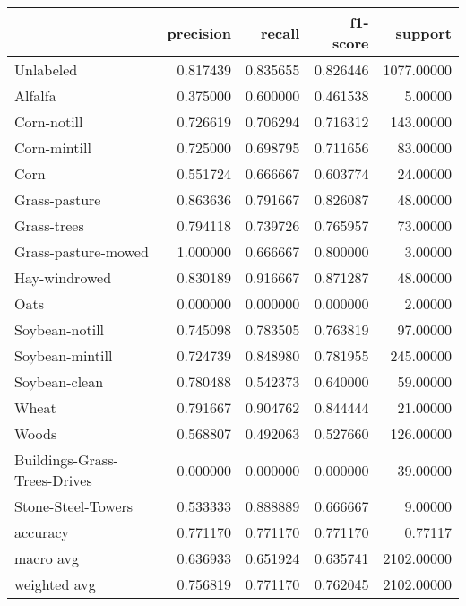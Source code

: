 \begin{tabular}{lrrrr}
\toprule
{} &  precision &    recall &  f1-score &     support \\
\midrule
Unlabeled                    &   0.817439 &  0.835655 &  0.826446 &  1077.00000 \\
Alfalfa                      &   0.375000 &  0.600000 &  0.461538 &     5.00000 \\
Corn-notill                  &   0.726619 &  0.706294 &  0.716312 &   143.00000 \\
Corn-mintill                 &   0.725000 &  0.698795 &  0.711656 &    83.00000 \\
Corn                         &   0.551724 &  0.666667 &  0.603774 &    24.00000 \\
Grass-pasture                &   0.863636 &  0.791667 &  0.826087 &    48.00000 \\
Grass-trees                  &   0.794118 &  0.739726 &  0.765957 &    73.00000 \\
Grass-pasture-mowed          &   1.000000 &  0.666667 &  0.800000 &     3.00000 \\
Hay-windrowed                &   0.830189 &  0.916667 &  0.871287 &    48.00000 \\
Oats                         &   0.000000 &  0.000000 &  0.000000 &     2.00000 \\
Soybean-notill               &   0.745098 &  0.783505 &  0.763819 &    97.00000 \\
Soybean-mintill              &   0.724739 &  0.848980 &  0.781955 &   245.00000 \\
Soybean-clean                &   0.780488 &  0.542373 &  0.640000 &    59.00000 \\
Wheat                        &   0.791667 &  0.904762 &  0.844444 &    21.00000 \\
Woods                        &   0.568807 &  0.492063 &  0.527660 &   126.00000 \\
Buildings-Grass-Trees-Drives &   0.000000 &  0.000000 &  0.000000 &    39.00000 \\
Stone-Steel-Towers           &   0.533333 &  0.888889 &  0.666667 &     9.00000 \\
accuracy                     &   0.771170 &  0.771170 &  0.771170 &     0.77117 \\
macro avg                    &   0.636933 &  0.651924 &  0.635741 &  2102.00000 \\
weighted avg                 &   0.756819 &  0.771170 &  0.762045 &  2102.00000 \\
\bottomrule
\end{tabular}
